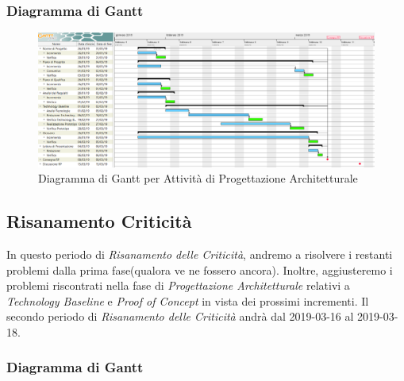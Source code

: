 \begin{landscape}
\subsubsection{Diagramma di Gantt}
\begin{figure}[h]
	\centering
  		\includegraphics[width=1.0\linewidth]{./images/ProgettazioneArchitetturale.png}
  		\caption{Diagramma di Gantt per Attività di Progettazione Architetturale}
  		\label{fig:Gantt Progettazione Architetturale}
\end{figure}
\end{landscape}

\subsection{Risanamento Criticità}
In questo periodo di \textit{Risanamento delle Criticità}, andremo a risolvere i restanti problemi dalla prima fase(qualora ve ne fossero ancora). Inoltre, aggiusteremo i problemi riscontrati nella fase di \textit{Progettazione Architetturale} relativi a \textit{Technology Baseline} e \textit{Proof of Concept} in vista dei prossimi incrementi.
Il secondo periodo di \textit{Risanamento delle Criticità} andrà dal 2019-03-16 al 2019-03-18.

\subsubsection{Diagramma di Gantt}

